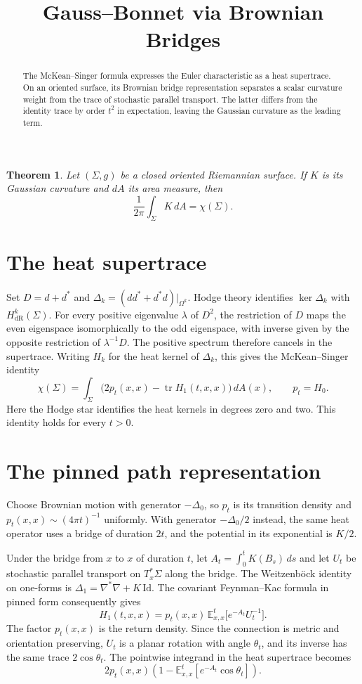 \documentclass[11pt]{article}
\title{Gauss--Bonnet via Brownian Bridges}
\author{}
\date{}
\newtheorem{theorem}{Theorem}
\newcommand{\E}{\mathbb E^t_{x,x}}
\begin{document}
\maketitle
\begin{abstract}
The McKean--Singer formula expresses the Euler characteristic as a heat
supertrace. On an oriented surface, its Brownian bridge representation
separates a scalar curvature weight from the trace of stochastic parallel
transport. The latter differs from the identity trace by order $t^2$ in
expectation, leaving the Gaussian curvature as the leading term.
\end{abstract}

\begin{theorem}
Let $(\Sigma,g)$ be a closed oriented Riemannian surface. If $K$ is its
Gaussian curvature and $dA$ its area measure, then
\[
  \frac{1}{2\pi}\int_\Sigma K\,dA=\chi(\Sigma).
\]
\end{theorem}

\section{The heat supertrace}
Set $D=d+d^*$ and $\Delta_k=(dd^*+d^*d)|_{\Omega^k}$. Hodge theory
identifies $\ker\Delta_k$ with $H^k_{\mathrm{dR}}(\Sigma)$. For every
positive eigenvalue $\lambda$ of $D^2$, the restriction of $D$ maps the
even eigenspace isomorphically to the odd eigenspace, with inverse given
by the opposite restriction of $\lambda^{-1}D$. The positive spectrum
therefore cancels in the supertrace. Writing $H_k$ for the heat kernel
of $\Delta_k$, this gives the McKean--Singer identity
\[
  \chi(\Sigma)=\int_\Sigma
  \bigl(2p_t(x,x)-\operatorname{tr}H_1(t,x,x)\bigr)\,dA(x),
  \qquad p_t=H_0 .
\]
Here the Hodge star identifies the heat kernels in degrees zero and
two. This identity holds for every $t>0$.

\section{The pinned path representation}
Choose Brownian motion with generator $-\Delta_0$, so $p_t$ is its
transition density and $p_t(x,x)\sim (4\pi t)^{-1}$ uniformly. With
generator $-\Delta_0/2$ instead, the same heat operator uses a bridge of
duration $2t$, and the potential in its exponential is $K/2$.

Under the bridge from $x$ to $x$ of duration $t$, let
$A_t=\int_0^t K(B_s)\,ds$ and let $U_t$ be stochastic parallel transport
on $T_x^*\Sigma$ along the bridge. The Weitzenb\"ock identity on one-forms
is $\Delta_1=\nabla^*\nabla+K\,\mathrm{Id}$. The covariant Feynman--Kac
formula in pinned form \cite[Sec.~4]{hsu} consequently gives
\[
   H_1(t,x,x)=p_t(x,x)\,\E\bigl[e^{-A_t}U_t^{-1}\bigr].
\]
The factor $p_t(x,x)$ is the return density. Since the connection is
metric and orientation preserving, $U_t$ is a planar rotation with
angle $\theta_t$, and its inverse has the same trace $2\cos\theta_t$.
The pointwise integrand in the heat supertrace becomes
\begin{equation}\label{eq:integrand}
  2p_t(x,x)\left(1-\E[e^{-A_t}\cos\theta_t]\right).
\end{equation}
\end{document}
